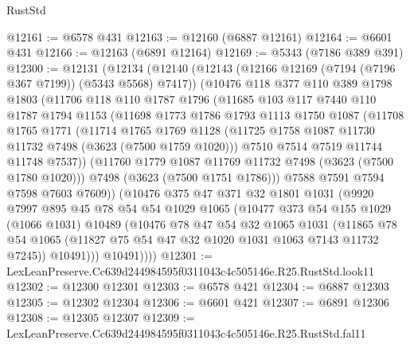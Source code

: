 \begin{lexlean}{RustStd}
\begin{coremodule}
@12161 := @6578 @431
@12163 := @12160 (@6887 @12161)
@12164 := @6601 @431
@12166 := @12163 (@6891 @12164)
@12169 := @5343 (@7186 @389 @391)
@12300 := @12131
    (@12134
      (@12140
        (@12143 (@12166 @12169 (@7194 (@7196 @367 @7199)) (@5343 @5568) @7417))
        (@10476
          @118
          @377
          @110
          @389
          @1798
          @1803
          (@11706
            @118
            @110
            @1787
            @1796
            (@11685
              @103
              @117
              @7440
              @110
              @1787
              @1794
              @1153
              (@11698
                @1773
                @1786
                @1793
                @1113
                @1750
                @1087
                (@11708
                  @1765
                  @1771
                  (@11714
                    @1765
                    @1769
                    @1128
                    (@11725 @1758 @1087 @11730 @11732 @7498 (@3623 (@7500 @1759 @1020)))
                    @7510
                    @7514
                    @7519
                    @11744
                    @11748
                    @7537))
                (@11760 @1779 @1087 @11769 @11732 @7498 (@3623 (@7500 @1780 @1020)))
                @7498
                (@3623 (@7500 @1751 @1786)))
              @7588
              @7591
              @7594
              @7598
              @7603
              @7609))
          (@10476
            @375
            @47
            @371
            @32
            @1801
            @1031
            (@9920
              @7997
              @895
              @45
              @78
              @54
              @54
              @1029
              @1065
              (@10477
                @373
                @54
                @155
                @1029
                (@1066 @1031)
                @10489
                (@10476
                  @78
                  @47
                  @54
                  @32
                  @1065
                  @1031
                  (@11865
                    @78
                    @54
                    @1065
                    (@11827 @75 @54 @47 @32 @1020 @1031 @1063 @7143 @11732 @7245))
                  @10491)))
            @10491))))
@12301 := LexLeanPreserve.Cc639d244984595f0311043c4c505146e.R25.RustStd.look11
@12302 := @12300 @12301
@12303 := @6578 @421
@12304 := @6887 @12303
@12305 := @12302 @12304
@12306 := @6601 @421
@12307 := @6891 @12306
@12308 := @12305 @12307
@12309 := LexLeanPreserve.Cc639d244984595f0311043c4c505146e.R25.RustStd.fal11

\end{coremodule}
\end{lexlean}
